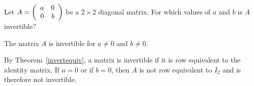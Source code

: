 \documentclass{ximera}
\begin{document}
\begin{exercise} \label{c4.8.3}
Let $A=\left(\begin{array}{rr} a & 0\\ 0 &b\end{array}\right)$ be a $2\times 2$ diagonal matrix.
For which values of $a$ and $b$ is $A$ invertible?

\begin{solution}

\ans The matrix $A$ is invertible for $a \neq 0$ and $b \neq 0$.

\soln By Theorem~\ref{invertequiv}, a matrix is invertible if it is row
equivalent to the identity matrix.  If $a = 0$ or if $b = 0$, then
$A$ is not row equivalent to $I_2$ and is therefore not invertible.

\end{solution}
\end{exercise}
\end{document}
